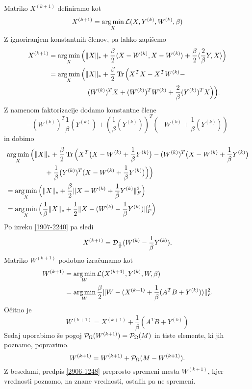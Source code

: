 Matriko $X^{(k+1)}$ definiramo kot
\[
    X^{(k+1)} = \operatorname*{arg\,min}_X \mathcal{L}(X, Y^{(k)}, W^{(k)}, \beta)
\]
Z ignoriranjem konstantnih členov, pa lahko zapišemo
\begin{align*}
    X^{(k+1)} & = \operatorname*{arg\,min}_X \Big( \lVert X\rVert_* + \frac{\beta}{2}\langle X-W^{(k)}, X-W^{(k)} \rangle + \frac{\beta}{2}\langle \frac{2}{\beta}Y, X \rangle \Big) \\
              & = \operatorname*{arg\,min}_X \Big( \lVert X\rVert_* + \frac{\beta}{2}\operatorname{Tr}\Big(X^TX - X^TW^{(k)} -                                                   \\
              & \hspace{2cm} (W^{(k)})^TX + (W^{(k)})^TW^{(k)} + \frac{2}{\beta}(Y^{(k)})^TX \Big)\Big).
\end{align*}
Z namenom faktorizacije dodamo konstantne člene
\[-(W^{(k)})^T\frac{1}{\beta}(Y^{(k)}) + (\frac{1}{\beta}(Y^{(k)}))^T(-W^{(k)} + \frac{1}{\beta}(Y^{(k)}))\]
in dobimo
\begin{align*}
     & \operatorname*{arg\,min}_X \Big( \lVert X\rVert_* + \frac{\beta}{2}\operatorname{Tr}\Big(X^T\big(X - W^{(k)} + \frac{1}{\beta}Y^{(k)}\big) - (W^{(k)})^T \big(X - W^{(k)} + \frac{1}{\beta}Y^{(k)}\big) \\
     & \hspace{2cm} +\frac{1}{\beta}\big(Y^{(k)})^T(X - W^{(k)} + \frac{1}{\beta}Y^{(k)}\big)\Big) \Big)                                                                 \\
     & = \operatorname*{arg\,min}_X \Big( \lVert X\rVert_* + \frac{\beta}{2} \lVert X-W^{(k)} + \frac{1}{\beta}Y^{(k)}\rVert_F^2 \Big)                                                                        \\
     & = \operatorname*{arg\,min}_X \Big( \frac{1}{\beta}\lVert X\rVert_* +  \frac{1}{2}\lVert X-(W^{(k)} - \frac{1}{\beta}Y^{(k)})\rVert_F^2\Big)  
\end{align*}
Po izreku \ref{1907-2240}  pa sledi
\[
    X^{(k+1)} = \mathcal{D}_\frac{1}{\beta}(W^{(k)} - \frac{1}{\beta} Y^{(k)}).
\]
Matriko $W^{(k+1)}$ podobno izračunamo kot
\begin{align*}
    W^{(k+1)} & = \operatorname*{arg\,min}_{W} \mathcal{L}(X^{(k+1)}, Y^{(k)}, W, \beta)                                   \\
              & = \operatorname*{arg\,min}_W \frac{\beta}{2} \lVert W - (X^{(k+1)} + \frac{1}{\beta}(A^T B + Y^{(k)})) \rVert_F^2
\end{align*}
Očitno je
\[
    W^{(k+1)} = X^{(k+1)} + \frac{1}{\beta}(A^T B + Y^{(k)})
\]
Sedaj uporabimo še pogoj $\mathcal{P}_\Omega(W^{(k+1)}) = \mathcal{P}_\Omega(M)$ in tiste elemente, ki jih poznamo, popravimo.
\begin{equation}
    \label{2906-1248}
    W^{(k+1)} = W^{(k+1)} + \mathcal{P}_\Omega(M - W^{(k+1)}).
\end{equation}
Z besedami, predpis \eqref{2906-1248}
preprosto spremeni mesta $W^{(k+1)}$, kjer vrednosti poznamo, na znane vrednosti, ostalih pa ne spremeni.

